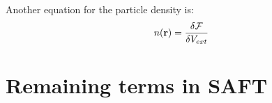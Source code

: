Another equation for the particle density is:
\begin{align}
n(\textbf{r}) = \frac{\delta \mathcal{F}}{\delta V_{ext}}
\end{align}

\clearpage
\newpage




\section{Remaining terms in SAFT}

